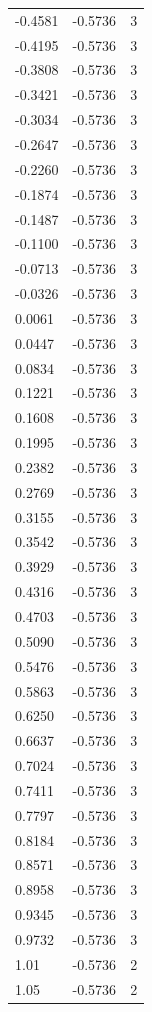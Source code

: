 \begin{longtable}{lrr}
  -0.4581 & -0.5736 & 3 \\
  -0.4195 & -0.5736 & 3 \\
  -0.3808 & -0.5736 & 3 \\
  -0.3421 & -0.5736 & 3 \\
  -0.3034 & -0.5736 & 3 \\
  -0.2647 & -0.5736 & 3 \\
  -0.2260 & -0.5736 & 3 \\
  -0.1874 & -0.5736 & 3 \\
  -0.1487 & -0.5736 & 3 \\
  -0.1100 & -0.5736 & 3 \\
  -0.0713 & -0.5736 & 3 \\
  -0.0326 & -0.5736 & 3 \\
  0.0061 & -0.5736 & 3 \\
  0.0447 & -0.5736 & 3 \\
  0.0834 & -0.5736 & 3 \\
  0.1221 & -0.5736 & 3 \\
  0.1608 & -0.5736 & 3 \\
  0.1995 & -0.5736 & 3 \\
  0.2382 & -0.5736 & 3 \\
  0.2769 & -0.5736 & 3 \\
  0.3155 & -0.5736 & 3 \\
  0.3542 & -0.5736 & 3 \\
  0.3929 & -0.5736 & 3 \\
  0.4316 & -0.5736 & 3 \\
  0.4703 & -0.5736 & 3 \\
  0.5090 & -0.5736 & 3 \\
  0.5476 & -0.5736 & 3 \\
  0.5863 & -0.5736 & 3 \\
  0.6250 & -0.5736 & 3 \\
  0.6637 & -0.5736 & 3 \\
  0.7024 & -0.5736 & 3 \\
  0.7411 & -0.5736 & 3 \\
  0.7797 & -0.5736 & 3 \\
  0.8184 & -0.5736 & 3 \\
  0.8571 & -0.5736 & 3 \\
  0.8958 & -0.5736 & 3 \\
  0.9345 & -0.5736 & 3 \\
  0.9732 & -0.5736 & 3 \\
  1.01 & -0.5736 & 2 \\
  1.05 & -0.5736 & 2 \\

\end{longtable}
